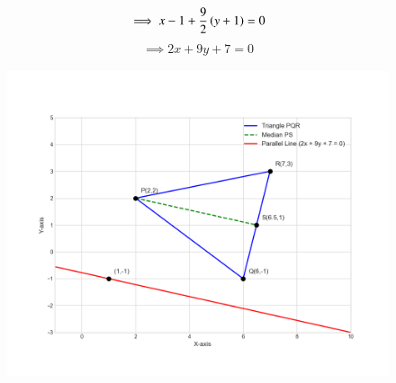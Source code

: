 \documentclass[journal]{IEEEtran}
\begin{document}
\begin{align}
    \implies x-1 + \frac{9}{2}\left(y+1\right)=0
\end{align}
\begin{align}
    \implies 2x+9y+7=0
\end{align}
\begin{figure}[H]
\begin{center}
\includegraphics[width=0.8\columnwidth]{figs/fig.png}
\end{center}
\end{figure}
\end{document}
